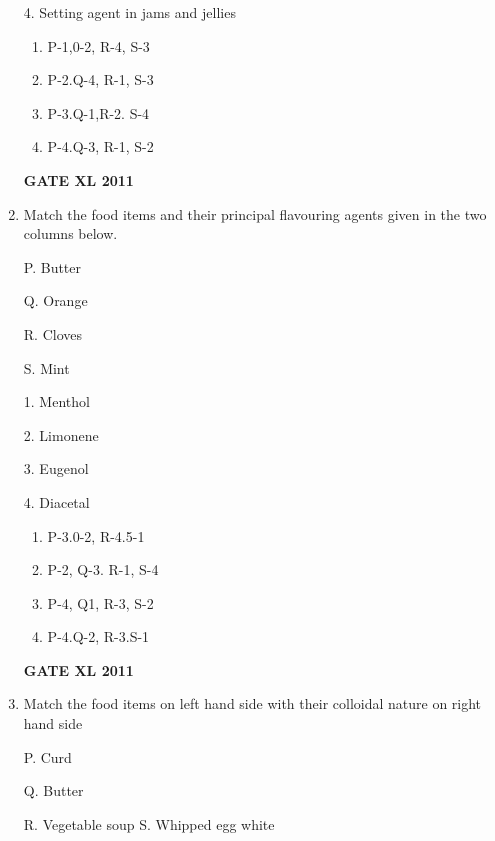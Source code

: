 \documentclass[journal,12pt,onecolumn]{IEEEtran}
\begin{document}
\begin{enumerate}
\begin{minipage}{0.5\textwidth}
\begin{flushleft}
4. Setting agent in jams and jellies
		\end{flushleft}
		\end{minipage}

\begin{enumerate}
	\item P-1,0-2, R-4, S-3
	\item P-2.Q-4, R-1, S-3
	\item P-3.Q-1,R-2. S-4
	\item P-4.Q-3, R-1, S-2
\end{enumerate}
\hfill{\textbf{GATE XL 2011}}

\item {Match the food items and their principal flavouring agents given in the two columns below.}
	\newline
\begin{minipage}{0.5\textwidth}
	\begin{flushleft}

P. Butter

Q. Orange


R. Cloves

S. Mint
		\end{flushleft}
		\end{minipage}
	\begin{minipage}{0.5\textwidth}
		\begin{flushleft}
1. Menthol


2. Limonene


3. Eugenol


4. Diacetal
		\end{flushleft}
		\end{minipage}
\begin{enumerate}
	\item P-3.0-2, R-4.5-1
	\item P-2, Q-3. R-1, S-4
	\item P-4, Q1, R-3, S-2
	\item P-4.Q-2, R-3.S-1
\end{enumerate}
\hfill{\textbf{GATE XL 2011}}


\item{ Match the food items on left hand side with their colloidal nature on right hand side}
	\newline
\begin{minipage}{0.5\textwidth}
	\begin{flushleft}

P. Curd

Q. Butter

R. Vegetable soup
S. Whipped egg white


\end{flushleft}
\end{minipage}
\end{enumerate}
\end{document}

